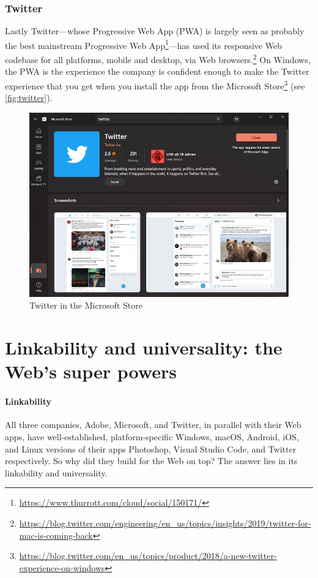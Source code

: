 \documentclass[sigconf]{acmart}
\begin{document}
\subsubsection{Twitter}
Lastly Twitter—whose Progressive Web App (PWA) is largely seen as probably the best mainstream Progressive Web App\footnote{\url{https://www.thurrott.com/cloud/social/150171/}}—has used its responsive Web codebase for all platforms, mobile and desktop, via Web browsers.\footnote{\url{https://blog.twitter.com/engineering/en_us/topics/insights/2019/twitter-for-mac-is-coming-back}} On Windows, the PWA is the experience the company is confident enough to make the Twitter experience that you get when you install the app from the Microsoft Store\footnote{\url{https://blog.twitter.com/en_us/topics/product/2018/a-new-twitter-experience-on-windows}} (see \autoref{fig:twitter}).

\begin{figure}[t]
    \centering
    \includegraphics[width=0.8\columnwidth]{twitter.png}
    \caption{Twitter in the Microsoft Store}
    \label{fig:twitter}
\end{figure}

\section{Linkability and universality: the Web's super powers}

\paragraph{Linkability}

All three companies, Adobe, Microsoft, and Twitter, in parallel with their Web apps, have well-established, platform-specific Windows, macOS, Android, iOS, and Linux versions of their apps Photoshop, Visual Studio Code, and Twitter respectively. So why did they build for the Web on top? The answer lies in its linkability and universality.
\end{document}
